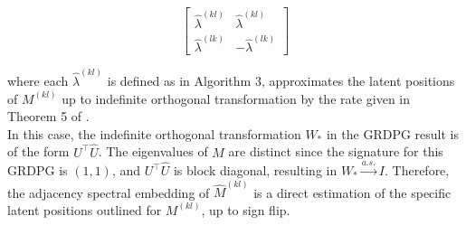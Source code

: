 \documentclass[12pt]{article}
\begin{document}
\[\begin{bmatrix} 
  \hat{\lambda}^{(kl)} & \hat{\lambda}^{(kl)} \\ 
  \hat{\lambda}^{(lk)} & -\hat{\lambda}^{(lk)} 
\end{bmatrix}\]

where each \(\hat{\lambda}^{(kl)}\) is defined as in Algorithm 3,
approximates the latent positions of \(M^{(kl)}\) up to indefinite
orthogonal transformation by the rate given in Theorem 5 of
\citeauthor{rubindelanchy2017statistical}.\\
In this case, the indefinite orthogonal transformation \(W_*\) in the
GRDPG result \cite{rubindelanchy2017statistical} is of the form
\(U^\top \hat{U}\). The eigenvalues of \(M\) are distinct since the
signature for this GRDPG is \((1, 1)\), and \(U^\top \hat{U}\) is block
diagonal, resulting in \(W_* \stackrel{a.s.}{\to} I\). Therefore, the
adjacency spectral embedding of \(\hat{M}^{(kl)}\) is a direct
estimation of the specific latent positions outlined for \(M^{(kl)}\),
up to sign flip.

\renewcommand\refname{References}
  
\end{document}
